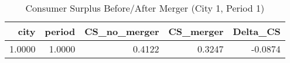 \begin{table}[htbp]
    \centering
    \caption{Consumer Surplus Before/After Merger (City 1, Period 1)}
    \label{tab:q12_welfare_city1_period1}
\toprule
\begin{tabular}{rrrrr}
\toprule
city & period & CS_no_merger & CS_merger & Delta_CS \\
\midrule
\midrule
1.0000 & 1.0000 & 0.4122 & 0.3247 & -0.0874 \\
\bottomrule
\bottomrule
\end{tabular}

\end{table}
